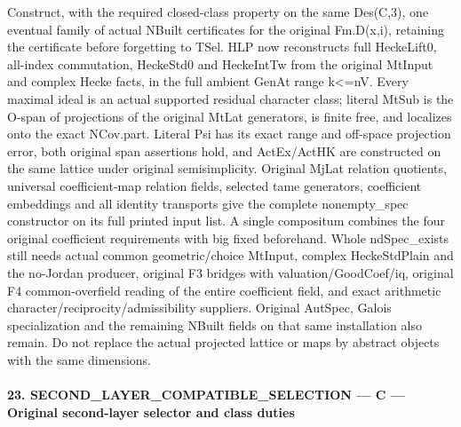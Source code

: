 Construct, with the required closed-class property on the same Des(C,3), one eventual family of actual NBuilt certificates for the original Fm.D(x,i), retaining the certificate before forgetting to TSel. HLP now reconstructs full HeckeLift0, all-index commutation, HeckeStd0 and HeckeIntTw from the original MtInput and complex Hecke facts, in the full ambient GenAt range k<=nV. Every maximal ideal is an actual supported residual character class; literal MtSub is the O-span of projections of the original MtLat generators, is finite free, and localizes onto the exact NCov.part. Literal Psi has its exact range and off-space projection error, both original span assertions hold, and ActEx/ActHK are constructed on the same lattice under original semisimplicity. Original MjLat relation quotients, universal coefficient-map relation fields, selected tame generators, coefficient embeddings and all identity transports give the complete nonempty\_\allowbreak spec constructor on its full printed input list. A single compositum combines the four original coefficient requirements with big fixed beforehand. Whole ndSpec\_\allowbreak exists still needs actual common geometric/choice MtInput, complex HeckeStdPlain and the no-Jordan producer, original F3 bridges with valuation/GoodCoef/iq, original F4 common-overfield reading of the entire coefficient field, and exact arithmetic character/reciprocity/admissibility suppliers. Original AutSpec, Galois specialization and the remaining NBuilt fields on that same installation also remain. Do not replace the actual projected lattice or maps by abstract objects with the same dimensions.



\paragraph{23. SECOND\_\allowbreak LAYER\_\allowbreak COMPATIBLE\_\allowbreak SELECTION — C — Original second-layer selector and class duties}

